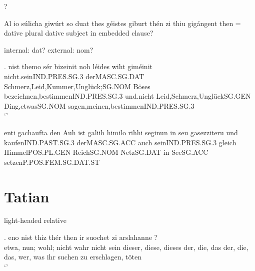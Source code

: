 ?

Al	io	súlicha	giwúrt	so	duat	thes	géistes	giburt	thén	zi	thiu	gigángent
then = dative plural
dative subject in embedded clause?



internal: dat? external: nom?

\exg. nist	themo	sér	bizeinit	noh	léides	wiht	giméinit\\
nicht.seinIND.PRES.SG.3	derMASC.SG.DAT	Schmerz,Leid,Kummer,Unglück;SG.NOM Böses	bezeichnen,bestimmenIND.PRES.SG.3 und.nicht Leid,Schmerz,UnglückSG.GEN	Ding,etwasSG.NOM	sagen,meinen,bestimmenIND.PRES.SG.3\\
  `' 



 enti	gachaufta	den	Auh	ist	galiih	himilo	rihhi	seginun	in	seu	gasezziteru
 und	kaufenIND.PAST.SG.3		derMASC.SG.ACC		auch	seinIND.PRES.SG.3	gleich	HimmelPOS.PL.GEN	ReichSG.NOM		NetzSG.DAT		in	SeeSG.ACC		setzenP.POS.FEM.SG.DAT.ST

\phantom{x}



\section{Tatian}

light-headed relative

\exg. eno	nist	thiz	thér	then	ir	suochet	zi	arslahanne	?\\
 etwa, nun; wohl; nicht wahr	nicht	sein	dieser, diese, dieses	der, die, das	der, die, das, wer, was	ihr	suchen	zu	erschlagen, töten\\
 `'

\phantom{x}
